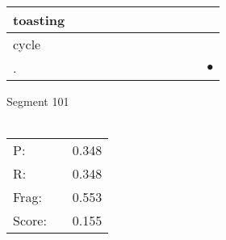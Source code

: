 \documentclass[landscape]{article}
\newcommand{\ssp}{\hspace{2pt}}
\newcommand{\mex}{\cellcolor{g}$\bullet$}
\begin{document}
\begin{tabular}{|l|p{10pt}|p{10pt}|p{10pt}|p{10pt}|p{10pt}|p{10pt}|p{10pt}|p{10pt}|p{10pt}|p{10pt}|p{10pt}|}
\hline
\ssp toasting \ssp&\hspace{2pt}&\hspace{2pt}&\hspace{2pt}&\hspace{2pt}&\hspace{2pt}&\hspace{2pt}&\hspace{2pt}&\hspace{2pt}&\hspace{2pt}&\hspace{2pt}&\hspace{2pt}\\
\hline
\ssp cycle \ssp&\hspace{2pt}&\hspace{2pt}&\hspace{2pt}&\hspace{2pt}&\hspace{2pt}&\hspace{2pt}&\hspace{2pt}&\hspace{2pt}&\hspace{2pt}&\hspace{2pt}&\hspace{2pt}\\
\hline
\ssp \cellcolor{ref10}. \ssp&\hspace{2pt}&\hspace{2pt}&\hspace{2pt}&\hspace{2pt}&\hspace{2pt}&\hspace{2pt}&\hspace{2pt}&\hspace{2pt}&\hspace{2pt}&\hspace{2pt}&\hspace{2pt}\mex\\
\hline
\end{tabular}

\vspace{6pt}
\noindent Segment 101\\\\
\noindent\begin{tabular}{lm{12pt}r}
\hline
P:&&0.348\\
R:&&0.348\\
Frag:&&0.553\\
Score:&&0.155\\
\end{tabular}
\end{document}
